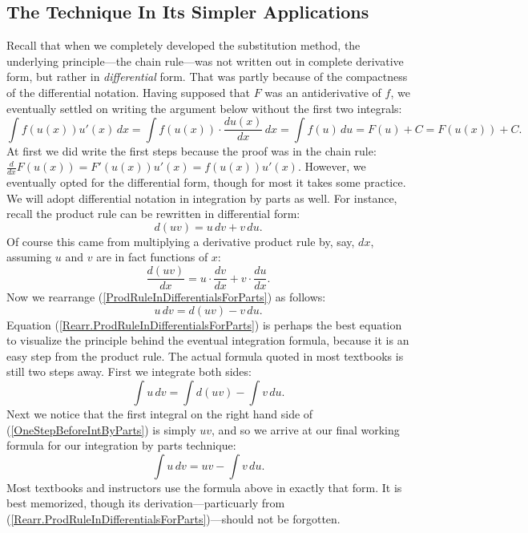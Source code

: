 \subsection{The Technique In Its Simpler Applications}
Recall that when we completely developed the substitution method, 
the underlying 
principle---the chain rule---was not written out in complete
derivative form, but rather in {\it differential} form.
That was partly because of the compactness of the differential
notation.  Having supposed that $F$ was an antiderivative of $f$,
we eventually settled on writing the argument below without
the first two integrals:
$$\int f(u(x))u'(x)\,dx=\int f(u(x))\cdot\frac{du(x)}{dx}\,dx
 =\int f(u)\,du=F(u)+C=F(u(x))+C.$$
At first we did write the first steps because the proof was in the chain
rule: $\frac{d}{dx}F(u(x))=F'(u(x))u'(x)=f(u(x))u'(x).$
However, we eventually opted for the differential form, though for
most it takes some practice.  We will adopt differential notation
in integration by parts as well.  For instance, recall the 
product rule can be rewritten in differential form:
\begin{equation}
d(uv)=u\,dv+v\,du.\label{ProdRuleInDifferentialsForParts}
\end{equation}
Of course this came from multiplying a derivative product rule
by, say, $dx$, assuming $u$ and $v$ are in fact functions of $x$:
$$\frac{d(uv)}{dx}=u\cdot\frac{dv}{dx}+v\cdot\frac{du}{dx}.$$
Now we rearrange (\ref{ProdRuleInDifferentialsForParts}) as follows:
\begin{equation}
u\,dv=d(uv)-v\,du.\label{Rearr.ProdRuleInDifferentialsForParts}
\end{equation}
Equation (\ref{Rearr.ProdRuleInDifferentialsForParts}) is perhaps
the best equation to visualize the principle behind the eventual
integration formula, because it is an easy step from the product rule.
The actual formula quoted in most textbooks is still two steps away.
First we integrate both sides:
\begin{equation}\int u\,dv=\int d(uv)-\int v\,du.
\label{OneStepBeforeIntByParts}\end{equation}
Next we  notice that the first integral on the right hand side of 
(\ref{OneStepBeforeIntByParts}) is simply $uv$, and so we arrive
at our final working formula for our integration by parts technique:
\begin{equation}
\boxed{\int u\,dv=uv-\int v\,du.}\label{IntByPartsFormula}\end{equation}
Most textbooks and instructors use the formula above in exactly that
form.  It is best memorized, though its derivation---particuarly
from (\ref{Rearr.ProdRuleInDifferentialsForParts})---should
not be forgotten.  

